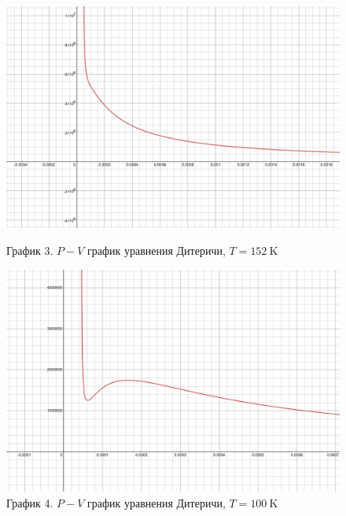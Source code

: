 \documentclass[a4paper]{article}
\numberwithin{equation}{subsection} %
\begin{document}
\begin{figure}[h!]
    \centering
    \begin{minipage}{0.49\textwidth}
        \centering
        \includegraphics[width=\linewidth]{Graphics/Dieterici/152.png}
        \caption{\label{fig:clausius_1}График 3. $P-V$ график уравнения Дитеричи, $T = 152 \ \text{K}$}
    \end{minipage}
    \hfill
    \begin{minipage}{0.49\textwidth}
        \centering
        \includegraphics[width=\linewidth]{Graphics/Dieterici/100.png}
        \caption{\label{fig:clausius_2}График 4. $P-V$ график уравнения Дитеричи, $T = 100 \ \text{K}$}
    \end{minipage}
\end{figure}
\end{document}
